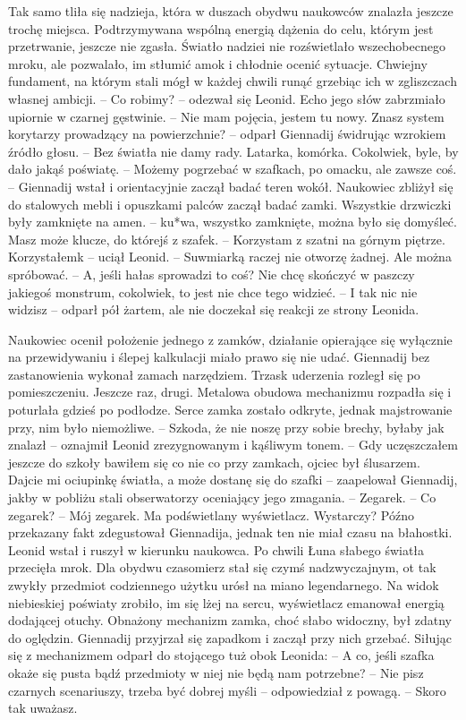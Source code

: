 \documentclass[../MAIN.tex]{subfiles}
\begin{document}
Tak samo tliła się nadzieja, która w duszach obydwu naukowców znalazła jeszcze trochę miejsca. Podtrzymywana wspólną energią dążenia do celu, którym jest przetrwanie, jeszcze nie zgasła. Światło nadziei nie rozświetlało wszechobecnego mroku, ale pozwalało, im stłumić amok i chłodnie ocenić sytuacje. Chwiejny fundament, na którym stali mógł w każdej chwili runąć grzebiąc ich w zgliszczach własnej ambicji. 
-- Co robimy? -- odezwał się Leonid. Echo jego słów zabrzmiało upiornie w czarnej gęstwinie. 
-- Nie mam pojęcia, jestem tu nowy. Znasz system korytarzy prowadzący na powierzchnie? -- odparł Giennadij świdrując wzrokiem źródło głosu. 
-- Bez światła nie damy rady. Latarka, komórka. Cokolwiek, byle, by dało jakąś poświatę. 
-- Możemy pogrzebać w szafkach, po omacku, ale zawsze coś. -- Giennadij wstał i orientacyjnie zaczął badać teren wokół. 
Naukowiec zbliżył się do stalowych mebli i opuszkami palców zaczął badać zamki. Wszystkie drzwiczki były zamknięte na amen.
-- ku*wa, wszystko zamknięte, można było się domyśleć. Masz może klucze, do którejś z szafek. 
-- Korzystam z szatni na górnym piętrze. Korzystałem\3k -- uciął Leonid. 
-- Suwmiarką raczej nie otworzę żadnej. Ale można spróbować. 
-- A, jeśli hałas sprowadzi to coś? Nie chcę skończyć w paszczy jakiegoś monstrum, cokolwiek, to jest nie chce tego widzieć. 
-- I tak nic nie widzisz -- odparł pół żartem, ale nie doczekał się reakcji ze strony Leonida. 

Naukowiec ocenił położenie jednego z zamków, działanie opierające się wyłącznie na przewidywaniu i ślepej kalkulacji miało prawo się nie udać. Giennadij bez zastanowienia wykonał zamach narzędziem. Trzask uderzenia rozległ się po pomieszczeniu. Jeszcze raz, drugi. Metalowa obudowa mechanizmu rozpadła się i poturlała gdzieś po podłodze. Serce zamka zostało odkryte, jednak majstrowanie przy, nim było niemożliwe. 
-- Szkoda, że nie noszę przy sobie brechy, byłaby jak znalazł -- oznajmił Leonid zrezygnowanym i kąśliwym tonem. 
-- Gdy uczęszczałem jeszcze do szkoły bawiłem się co nie co przy zamkach, ojciec był ślusarzem. Dajcie mi ociupinkę światła, a może dostanę się do szafki -- zaapelował Giennadij, jakby w pobliżu stali obserwatorzy oceniający jego zmagania. 
-- Zegarek. 
-- Co zegarek? 
-- Mój zegarek. Ma podświetlany wyświetlacz. Wystarczy? 
Późno przekazany fakt zdegustował Giennadija, jednak ten nie miał czasu na błahostki. Leonid wstał i ruszył w kierunku naukowca. Po chwili Łuna słabego światła przecięła mrok. Dla obydwu czasomierz stał się czymś nadzwyczajnym, ot tak zwykły przedmiot codziennego użytku urósł na miano legendarnego. Na widok niebieskiej poświaty zrobiło, im się lżej na sercu, wyświetlacz emanował energią dodającej otuchy. Obnażony mechanizm zamka, choć słabo widoczny, był zdatny do oględzin. Giennadij przyjrzał się zapadkom i zaczął przy nich grzebać. Siłując się z mechanizmem odparł do stojącego tuż obok Leonida: 
-- A co, jeśli szafka okaże się pusta bądź przedmioty w niej nie będą nam potrzebne? 
-- Nie pisz czarnych scenariuszy, trzeba być dobrej myśli -- odpowiedział z powagą. 
-- Skoro tak uważasz. 
\end{document}
